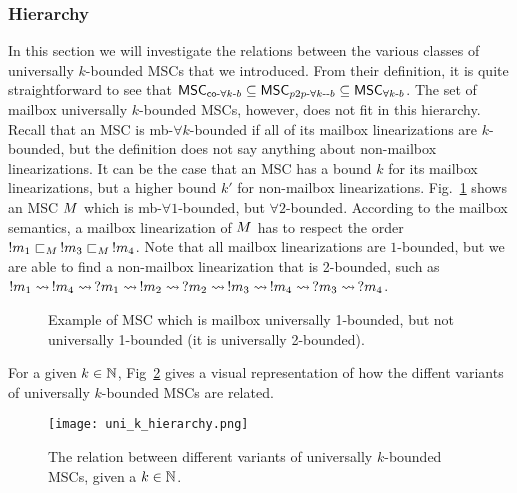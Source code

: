 \documentclass{article}
\begin{document}
\subsubsection{Hierarchy}

In this section we will investigate the relations between the various classes of universally $k$-bounded MSCs that we introduced. From their definition, it is quite straightforward to see that $\mathsf{MSC}_{\mathsf{co}\text{-}\forall k\text{-}b} \subseteq \mathsf{MSC}_{p2p\text{-}\forall k\text{-}\text{-}b} \subseteq \mathsf{MSC}_{\forall k\text{-}b}$. The set of mailbox universally $k$-bounded MSCs, however, does not fit in this hierarchy. Recall that an MSC is mb-$\forall k$-bounded if all of its mailbox linearizations are $k$-bounded, but the definition does not say anything about non-mailbox linearizations. It can be the case that an MSC has a bound $k$ for its mailbox linearizations, but a higher bound $k'$ for non-mailbox linearizations. Fig.~\ref{fig:mb_uk} shows an MSC $M$ which is mb-$\forall 1$-bounded, but $\forall 2$-bounded. According to the mailbox semantics, a mailbox linearization of $M$ has to respect the order $!m_1 \sqsubset_M\, !m_3 \sqsubset_M\, !m_4$. Note that all mailbox linearizations are $1$-bounded, but we are able to find a non-mailbox linearization that is 2-bounded, such as $!m_1 \rightsquigarrow\, !m_4 \rightsquigarrow\, ?m_1 \rightsquigarrow\, !m_2 \rightsquigarrow\, ?m_2 \rightsquigarrow\, !m_3 \rightsquigarrow\, !m_4 \rightsquigarrow\, ?m_3 \rightsquigarrow\, ?m_4$.

\begin{figure}[h]
\begin{center}
\caption{Example of MSC which is mailbox universally 1-bounded, but not universally 1-bounded (it is universally 2-bounded).}
\label{fig:mb_uk}
\end{center}
\end{figure}

For a given $k \in \mathbb{N}$, Fig~\ref{fig:uk_hierarchy} gives a visual representation of how the diffent variants of universally $k$-bounded MSCs are related.

\begin{figure}[h]
	\centering
	\texttt{[image: uni\_k\_hierarchy.png]}
	\caption{The relation between different variants of universally $k$-bounded MSCs, given a $k \in \mathbb{N}$.}
	\label{fig:uk_hierarchy}
\end{figure}
\end{document}
